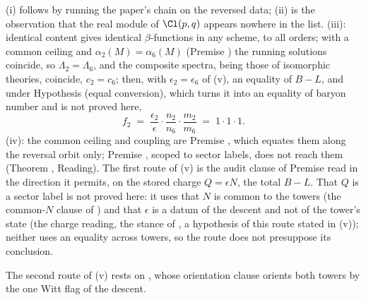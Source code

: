 (i) follows by running the paper's chain on the reversed data; (ii) is the observation that the real module of $\Cl(p,q)$ appears nowhere in the list. (iii): identical content gives identical $\beta$-functions in any scheme, to all orders; with a common ceiling and $\alpha_{2}(M) = \alpha_{6}(M)$ (Premise ) the running solutions coincide, so $\Lambda_{2} = \Lambda_{6}$, and the composite spectra, being those of isomorphic theories, coincide, $c_{2} = c_{6}$; then, with $\epsilon_{2} = \epsilon_{6}$ of (v), an equality of $B - L$, and under Hypothesis (equal conversion), which turns it into an equality of baryon number and is not proved here,
\[
f_{2} \;=\; \frac{\epsilon_{2}}{\epsilon}\cdot\frac{n_{2}}{n_{6}}\cdot\frac{m_{2}}{m_{6}} \;=\; 1 \cdot 1 \cdot 1 .
\] (iv): the common ceiling and coupling are Premise , which equates them along the reversal orbit only; Premise , scoped to sector labels, does not reach them (Theorem , Reading). The first route of (v) is the audit clause of Premise  read in the direction it permits, on the stored charge $Q = \epsilon N$, the total $B - L$. That $Q$ is a sector label is not proved here: it uses that $N$ is common to the towers (the common-$N$ clause of ) and that $\epsilon$ is a datum of the descent and not of the tower's state (the charge reading, the stance of , a hypothesis of this route stated in (v)); neither uses an equality across towers, so the route does not presuppose its conclusion.

The second route of (v) rests on , whose orientation clause orients both towers by the one Witt flag of the descent.
